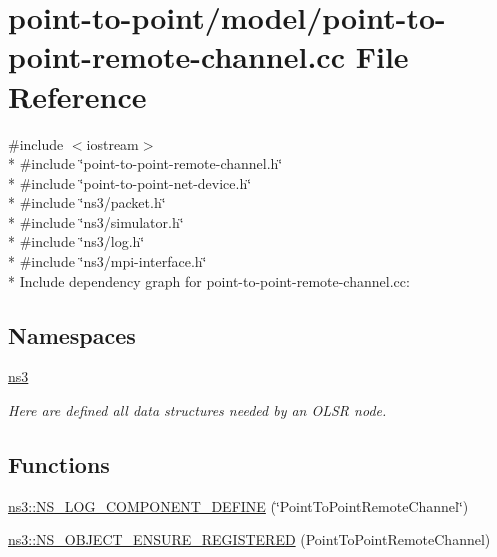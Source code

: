 \hypertarget{point-to-point-remote-channel_8cc}{}\section{point-\/to-\/point/model/point-\/to-\/point-\/remote-\/channel.cc File Reference}
\label{point-to-point-remote-channel_8cc}
{\ttfamily \#include $<$iostream$>$}\\*
{\ttfamily \#include \char`\"{}point-\/to-\/point-\/remote-\/channel.\+h\char`\"{}}\\*
{\ttfamily \#include \char`\"{}point-\/to-\/point-\/net-\/device.\+h\char`\"{}}\\*
{\ttfamily \#include \char`\"{}ns3/packet.\+h\char`\"{}}\\*
{\ttfamily \#include \char`\"{}ns3/simulator.\+h\char`\"{}}\\*
{\ttfamily \#include \char`\"{}ns3/log.\+h\char`\"{}}\\*
{\ttfamily \#include \char`\"{}ns3/mpi-\/interface.\+h\char`\"{}}\\*
Include dependency graph for point-\/to-\/point-\/remote-\/channel.cc\+:
\subsection*{Namespaces}
\begin{DoxyCompactItemize}
\item 
 \hyperlink{namespacens3}{ns3}
\begin{DoxyCompactList}\small\item\em Here are defined all data structures needed by an O\+L\+SR node. \end{DoxyCompactList}\end{DoxyCompactItemize}
\subsection*{Functions}
\begin{DoxyCompactItemize}
\item 
\hyperlink{namespacens3_aa0513dc7c57ffd01bafae8a8d95d0eae}{ns3\+::\+N\+S\+\_\+\+L\+O\+G\+\_\+\+C\+O\+M\+P\+O\+N\+E\+N\+T\+\_\+\+D\+E\+F\+I\+NE} (\char`\"{}Point\+To\+Point\+Remote\+Channel\char`\"{})
\item 
\hyperlink{namespacens3_ac2cde6cc33ef3725112716b1f762163e}{ns3\+::\+N\+S\+\_\+\+O\+B\+J\+E\+C\+T\+\_\+\+E\+N\+S\+U\+R\+E\+\_\+\+R\+E\+G\+I\+S\+T\+E\+R\+ED} (Point\+To\+Point\+Remote\+Channel)
\end{DoxyCompactItemize}
